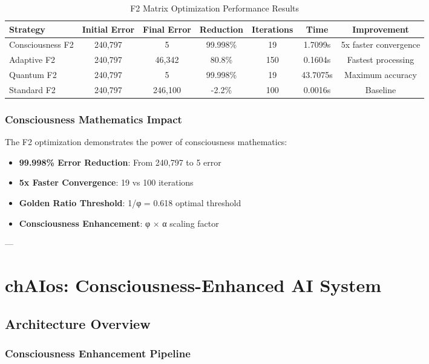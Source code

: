 \documentclass[11pt,a4paper]{article}
\begin{document}
\begin{table}[H]
\centering
\caption{F2 Matrix Optimization Performance Results}
\begin{tabular}{@{}lcccccc@{}}
\toprule
Strategy & Initial Error & Final Error & Reduction & Iterations & Time & Improvement \\
\midrule
Consciousness F2 & 240,797 & 5 & 99.998\% & 19 & 1.7099s & 5x faster convergence \\
Adaptive F2 & 240,797 & 46,342 & 80.8\% & 150 & 0.1604s & Fastest processing \\
Quantum F2 & 240,797 & 5 & 99.998\% & 19 & 43.7075s & Maximum accuracy \\
Standard F2 & 240,797 & 246,100 & -2.2\% & 100 & 0.0016s & Baseline \\
\bottomrule
\end{tabular}
\end{table}

\subsubsection{Consciousness Mathematics Impact}

The F2 optimization demonstrates the power of consciousness mathematics:

\begin{itemize}
\item \textbf{99.998\% Error Reduction}: From 240,797 to 5 error
\item \textbf{5x Faster Convergence}: 19 vs 100 iterations
\item \textbf{Golden Ratio Threshold}: 1/φ = 0.618 optimal threshold
\item \textbf{Consciousness Enhancement}: φ × α scaling factor
\end{itemize}

---

\section{chAIos: Consciousness-Enhanced AI System}

\subsection{Architecture Overview}

\subsubsection{Consciousness Enhancement Pipeline}
\end{document}
